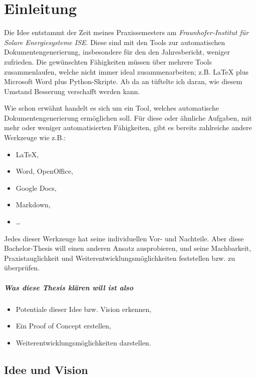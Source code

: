 \chapter{Einleitung}

Die Idee entstammt der Zeit meines Praxissemesters am
\emph{Fraunhofer-Institut für Solare Energiesysteme ISE}.
Diese sind mit den Tools zur automatischen Dokumentengenerierung, insbesondere
für den den Jahresbericht, weniger zufrieden. Die gewünschten
Fähigkeiten müssen über mehrere Tools zusammenlaufen, welche nicht immer
ideal zusammenarbeiten; z.B. LaTeX plus Microsoft Word plus Python-Skripte.
Ab da an tüftelte ich daran, wie diesem Umstand Besserung verschafft
werden kann.

Wie schon erwähnt handelt es sich um ein Tool, welches automatische
Dokumentengenerierung ermöglichen soll. Für diese oder ähnliche Aufgaben,
mit mehr oder weniger automatisierten Fähigkeiten,
gibt es bereits zahlreiche andere Werkzeuge wie z.B.:

\begin{itemize}
  \item LaTeX,
  \item Word, OpenOffice,
  \item Google Docs,
  \item Markdown,
  \item \ldots
\end{itemize}

Jedes dieser Werkzeuge hat seine individuellen Vor- und Nachteile.
Aber diese Bachelor-Thesis will einen anderen Ansatz ausprobieren, und
seine Machbarkeit, Praxistauglichkeit und Weiterentwicklungsmöglichkeiten
feststellen bzw. zu überprüfen.

\paragraph{Was diese Thesis klären will ist also}

\begin{itemize}
  \item Potentiale dieser Idee bzw. Vision erkennen,
  \item Ein Proof of Concept erstellen,
  \item Weiterentwicklungsmöglichkeiten darstellen.
\end{itemize}

\section{Idee und Vision}


